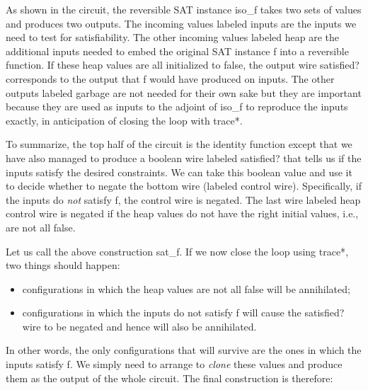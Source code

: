 \documentclass{llncs}
\begin{document}
As shown in the circuit, the reversible SAT instance {{iso_f}} takes
two sets of values and produces two outputs. The incoming values
labeled \textsf{inputs} are the inputs we need to test for
satisfiability. The other incoming values labeled \textsf{heap} are
the additional inputs needed to embed the original SAT instance {{f}}
into a reversible function. If these \textsf{heap} values are all
initialized to {{false}}, the output wire \textsf{satisfied?}
corresponds to the output that {{f}} would have produced on
\textsf{inputs}. The other outputs labeled \textsf{garbage} are not
needed for their own sake but they are important because they are used
as inputs to the adjoint of {{iso_f}} to reproduce the inputs exactly,
in anticipation of closing the loop with {{trace*}}.

To summarize, the top half of the circuit is the identity function
except that we have also managed to produce a boolean wire labeled
\textsf{satisfied?} that tells us if the inputs satisfy the desired
constraints. We can take this boolean value and use it to decide
whether to negate the bottom wire (labeled \textsf{control
  wire}). Specifically, if the inputs do \emph{not} satisfy {{f}}, the
control wire is negated. The last wire labeled \textsf{heap control
  wire} is negated if the heap values do not have the right initial
values, i.e., are not all {{false}}.

Let us call the above construction {{sat_f}}. If we now close the loop
using {{trace*}}, two things should happen:
\begin{itemize}
\item configurations in which the \textsf{heap} values are not all
  {{false}} will be annihilated;
\item configurations in which the \textsf{inputs} do not satisfy {{f}}
  will cause the \textsf{satisfied?} wire to be negated and hence will
  also be annihilated.
\end{itemize}
In other words, the only configurations that will survive are the ones in
which the \textsf{inputs} satisfy {{f}}. We simply need to arrange to
\emph{clone} these values and produce them as the output of the whole
circuit. The final construction is therefore:

\begin{center}
\end{center}  
\end{document}

